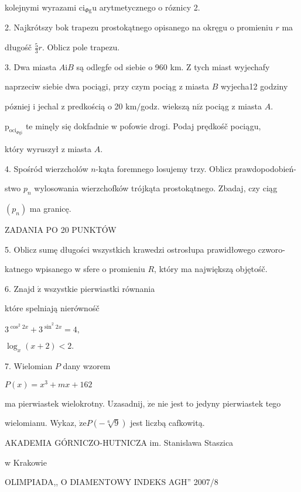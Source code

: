 \documentclass[a4paper,12pt]{article}
\begin{document}
kolejnymi wyrazami $\mathrm{c}\mathrm{i}_{\Phi \mathrm{g}}\mathrm{u}$ arytmetycznego o róznicy 2.

2. Najkrótszy bok trapezu prostokątnego opisanego na okręgu o promieniu $r$ ma

długośč $\displaystyle \frac{5}{3}r$. Oblicz pole trapezu.

3. Dwa miasta $A \mathrm{i} B$ są odlegfe od siebie o 960 km. $\mathrm{Z}$ tych miast wyjechafy

naprzeciw siebie dwa pociągi, przy czym pociąg z miasta $B$ wyjecha12 godziny

póz$\acute{}$niej i jechal z predkością o 20 $\mathrm{k}\mathrm{m}/$godz. wiekszą $\mathrm{n}\mathrm{i}\dot{\mathrm{z}}$ pociąg z miasta $A.$

$\mathrm{p}_{\mathrm{o}\mathrm{c}\mathrm{i}_{\Phi \mathrm{g}\mathrm{i}}}$ te minęly się dokfadnie w pofowie drogi. Podaj prędkośč pociągu,

który wyruszył z miasta $A.$

4. Spośród wierzcholów $n$-kąta foremnego losujemy trzy. Oblicz prawdopodobień-

stwo $p_{n}$ wylosowania wierzchofków trójkąta prostokątnego. Zbadaj, czy ciąg

$(p_{n})$ ma granicę.

ZADANIA PO 20 PUNKTÓW

5. Oblicz sumę długości wszystkich krawedzi ostrosłupa prawidłowego czworo-

katnego wpisanego w sfere o promieniu $R$, który ma największą objętośč.

6. Znajd $\acute{\mathrm{z}}$ wszystkie pierwiastki równania

które spelniają nierównośč

$3^{\cos^{2}2x}+3^{\sin^{2}2x}=4,$

$\log_{x}(x+2)<2.$

7. Wielomian $P$ dany wzorem

$P(x)=x^{3}+mx+162$

ma pierwiastek wielokrotny. Uzasadnij, $\dot{\mathrm{z}}\mathrm{e}$ nie jest to jedyny pierwiastek tego

wielomianu. Wykaz, $\dot{\mathrm{z}}\mathrm{e}P(-\sqrt[6]{9})$ jest liczbą cafkowitą.






AKADEMIA GÓRNICZO-HUTNICZA im. Stanislawa Staszica

w Krakowie

OLIMPIADA,, O DIAMENTOWY INDEKS AGH'' 2007/8
\end{document}
